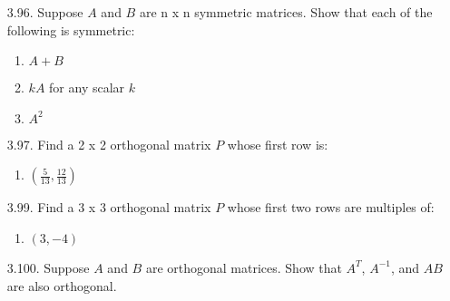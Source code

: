 \documentclass[12pt]{article}
\begin{document}
\begin{enumerate}
\begin{enumerate}
	\end{enumerate}
	
	
\item [3.96.] Suppose $A$ and $B$ are n x n symmetric matrices. Show that each of the following is symmetric:
	\begin{enumerate}
	\item $A+B$\\
	
	\item $kA$ for any scalar $k$\\
	
	\item $A^2$\\
	
	\end{enumerate}


\item [3.97.] Find a 2 x 2 orthogonal matrix $P$ whose first row is:
	\begin{enumerate}
	\item $(\frac{5}{13}, \frac{12}{13})$\\

	\end{enumerate}


\item [3.99.] Find a 3 x 3 orthogonal matrix $P$ whose first two rows are multiples of:
	\begin{enumerate}
	\item $(3, -4)$\\

	\end{enumerate}


\item [3.100.] Suppose $A$ and $B$ are orthogonal matrices. Show that $A^T$, $A^{-1}$, and $AB$ are also orthogonal.\\
\end{enumerate}
\end{document}
